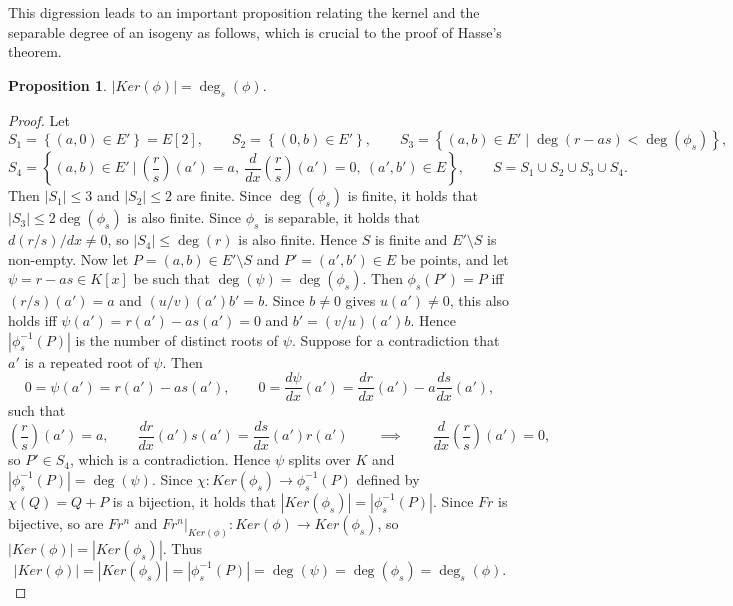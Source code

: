 \documentclass{article}
\newcommand{\val}[1]{\left. #1 \right\rvert}
\newcommand{\rb}[1]{\left( #1 \right)}
\renewcommand{\sb}[1]{\left[ #1 \right]}
\newcommand{\cb}[1]{\left\{ #1 \right\}}
\newcommand{\abs}[1]{\left\lvert #1 \right\rvert}
\theoremstyle{definition}
\newtheorem{proposition}{Proposition}[subsection]
\begin{document}
This digression leads to an important proposition relating the kernel and the separable degree of an isogeny as follows, which is crucial to the proof of Hasse's theorem.

\begin{proposition}
$ \abs{Ker\rb{\phi}} = \deg_s\rb{\phi} $.
\end{proposition}

\begin{proof}
Let
$$ S_1 = \cb{\rb{a, 0} \in E'} = E\sb{2}, \qquad S_2 = \cb{\rb{0, b} \in E'}, \qquad S_3 = \cb{\rb{a, b} \in E' \mid \deg\rb{r - as} < \deg\rb{\phi_s}}, $$
$$ S_4 = \cb{\rb{a, b} \in E' \ \Bigg| \ \rb{\dfrac{r}{s}}\rb{a'} = a, \ \dfrac{d}{dx}\rb{\dfrac{r}{s}}\rb{a'} = 0, \ \rb{a', b'} \in E}, \qquad S = S_1 \cup S_2 \cup S_3 \cup S_4. $$
Then $ \abs{S_1} \le 3 $ and $ \abs{S_2} \le 2 $ are finite. Since $ \deg\rb{\phi_s} $ is finite, it holds that $ \abs{S_3} \le 2\deg\rb{\phi_s} $ is also finite. Since $ \phi_s $ is separable, it holds that $ d\rb{r / s} / dx \ne 0 $, so $ \abs{S_4} \le \deg\rb{r} $ is also finite. Hence $ S $ is finite and $ E' \setminus S $ is non-empty. Now let $ P = \rb{a, b} \in E' \setminus S $ and $ P' = \rb{a', b'} \in E $ be points, and let $ \psi = r - as \in K\sb{x} $ be such that $ \deg\rb{\psi} = \deg\rb{\phi_s} $. Then $ \phi_s\rb{P'} = P $ iff $ \rb{r / s}\rb{a'} = a $ and $ \rb{u / v}\rb{a'}b' = b $. Since $ b \ne 0 $ gives $ u\rb{a'} \ne 0 $, this also holds iff $ \psi\rb{a'} = r\rb{a'} - as\rb{a'} = 0 $ and $ b' = \rb{v / u}\rb{a'}b $. Hence $ \abs{\phi_s^{-1}\rb{P}} $ is the number of distinct roots of $ \psi $. Suppose for a contradiction that $ a' $ is a repeated root of $ \psi $. Then
$$ 0 = \psi\rb{a'} = r\rb{a'} - as\rb{a'}, \qquad 0 = \dfrac{d\psi}{dx}\rb{a'} = \dfrac{dr}{dx}\rb{a'} - a\dfrac{ds}{dx}\rb{a'}, $$
such that
$$ \rb{\dfrac{r}{s}}\rb{a'} = a, \qquad \dfrac{dr}{dx}\rb{a'}s\rb{a'} = \dfrac{ds}{dx}\rb{a'}r\rb{a'} \qquad \implies \qquad \dfrac{d}{dx}\rb{\dfrac{r}{s}}\rb{a'} = 0, $$
so $ P' \in S_4 $, which is a contradiction. Hence $ \psi $ splits over $ K $ and $ \abs{\phi_s^{-1}\rb{P}} = \deg\rb{\psi} $. Since $ \chi : Ker\rb{\phi_s} \to \phi_s^{-1}\rb{P} $ defined by $ \chi\rb{Q} = Q + P $ is a bijection, it holds that $ \abs{Ker\rb{\phi_s}} = \abs{\phi_s^{-1}\rb{P}} $. Since $ Fr $ is bijective, so are $ Fr^n $ and $ \val{Fr^n}_{Ker\rb{\phi}} : Ker\rb{\phi} \to Ker\rb{\phi_s} $, so $ \abs{Ker\rb{\phi}} = \abs{Ker\rb{\phi_s}} $. Thus
$$ \abs{Ker\rb{\phi}} = \abs{Ker\rb{\phi_s}} = \abs{\phi_s^{-1}\rb{P}} = \deg\rb{\psi} = \deg\rb{\phi_s} = \deg_s\rb{\phi}. $$
\end{proof}
\end{document}
